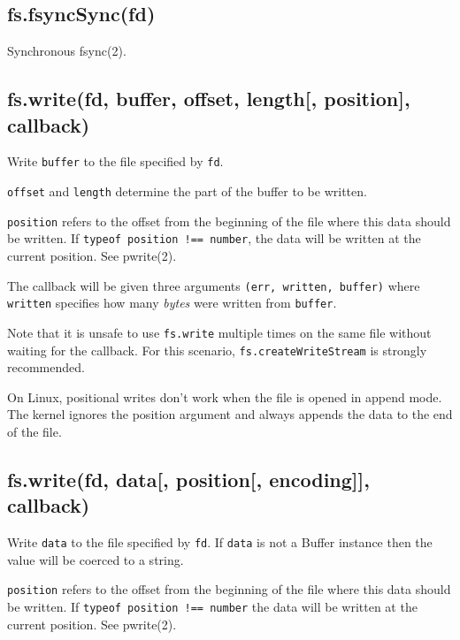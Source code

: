 \subsection{fs.fsyncSync(fd)}\label{fs.fsyncsyncfd}

Synchronous fsync(2).

\subsection{fs.write(fd, buffer, offset, length{[}, position{]},
callback)}\label{fs.writefd-buffer-offset-length-position-callback}

Write \texttt{buffer} to the file specified by \texttt{fd}.

\texttt{offset} and \texttt{length} determine the part of the buffer to
be written.

\texttt{position} refers to the offset from the beginning of the file
where this data should be written. If
\texttt{typeof\ position\ !==\ \textquotesingle{}number\textquotesingle{}},
the data will be written at the current position. See pwrite(2).

The callback will be given three arguments
\texttt{(err,\ written,\ buffer)} where \texttt{written} specifies how
many \emph{bytes} were written from \texttt{buffer}.

Note that it is unsafe to use \texttt{fs.write} multiple times on the
same file without waiting for the callback. For this scenario,
\texttt{fs.createWriteStream} is strongly recommended.

On Linux, positional writes don't work when the file is opened in append
mode. The kernel ignores the position argument and always appends the
data to the end of the file.

\subsection{fs.write(fd, data{[}, position{[}, encoding{]}{]},
callback)}\label{fs.writefd-data-position-encoding-callback}

Write \texttt{data} to the file specified by \texttt{fd}. If
\texttt{data} is not a Buffer instance then the value will be coerced to
a string.

\texttt{position} refers to the offset from the beginning of the file
where this data should be written. If
\texttt{typeof\ position\ !==\ \textquotesingle{}number\textquotesingle{}}
the data will be written at the current position. See pwrite(2).

